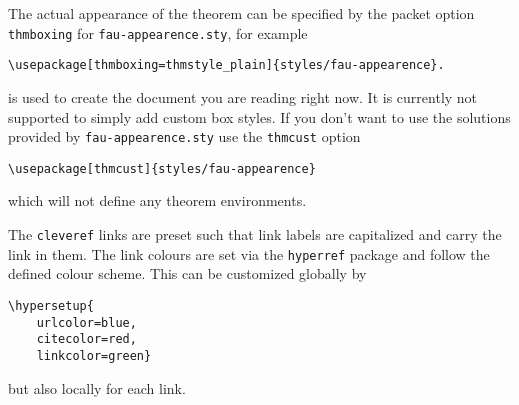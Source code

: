 The actual appearance of the theorem can be specified by the packet option \texttt{thmboxing} 
for \texttt{fau-appearence.sty}, for example
\begin{lstlisting}[language={[LaTeX]TeX}]
\usepackage[thmboxing=thmstyle_plain]{styles/fau-appearence}.
\end{lstlisting}
is used to create the document you are reading right now.
It is currently not supported to simply add custom box styles. If you don't want to use the 
solutions provided by \texttt{fau-appearence.sty} use the \texttt{thmcust} option 
\begin{lstlisting}[language={[LaTeX]TeX}]
\usepackage[thmcust]{styles/fau-appearence}
\end{lstlisting}
which will not define any theorem environments.\par
The \texttt{cleveref} links are preset such that link labels are capitalized and carry 
the link in them. The link colours are set via the \texttt{hyperref} package and follow the 
defined colour scheme. This can be customized globally by 
\begin{lstlisting}[language={[LaTeX]TeX}]
\hypersetup{
	urlcolor=blue,
	citecolor=red,
	linkcolor=green}
\end{lstlisting}
but also locally for each link.
